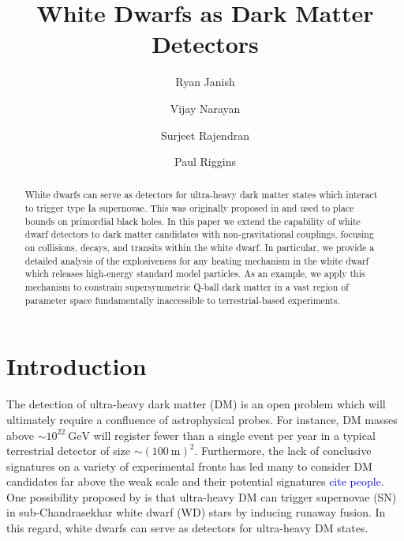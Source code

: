 \documentclass[twocolumn,showpacs,preprintnumbers,amsmath,amssymb,prd]{revtex4}
\newcommand{\GeV}{\text{GeV}}
\begin{document}
\title{White Dwarfs as Dark Matter Detectors}

\author{Ryan Janish}

\author{Vijay Narayan}

\author{Surjeet Rajendran}

\author{Paul Riggins}

\begin{abstract}

White dwarfs can serve as detectors for ultra-heavy dark matter states which interact to trigger type Ia supernovae.
This was originally proposed in \cite{Graham:2015apa} and used to  place bounds on primordial black holes.
In this paper we extend the capability of white dwarf detectors to dark matter candidates with non-gravitational couplings, focusing on collisions, decays, and transits within the white dwarf.
In particular, we provide a detailed analysis of the explosiveness for any heating mechanism in the white dwarf which releases high-energy standard model particles.
As an example, we apply this mechanism to constrain supersymmetric Q-ball dark matter in a vast region of parameter space fundamentally inaccessible to terrestrial-based experiments.


\end{abstract}
\maketitle


\section{Introduction}
\label{sec:Introduction}

The detection of ultra-heavy dark matter (DM) is an open problem which will ultimately require a confluence of astrophysical probes.
For instance, DM masses above $\sim 10^{22} ~\GeV$ will register fewer than a single event per year in a typical terrestrial detector of size $\sim (100 ~\text{m})^2$.
Furthermore, the lack of conclusive signatures on a variety of experimental fronts has led many to consider DM candidates far above the weak scale and their potential signatures \textcolor{blue}{cite people}.
One possibility proposed by \cite{Graham:2015apa} is that ultra-heavy DM can trigger supernovae (SN) in sub-Chandrasekhar white dwarf (WD) stars by inducing runaway fusion.
In this regard, white dwarfs can serve as detectors for ultra-heavy DM states.
\end{document}
